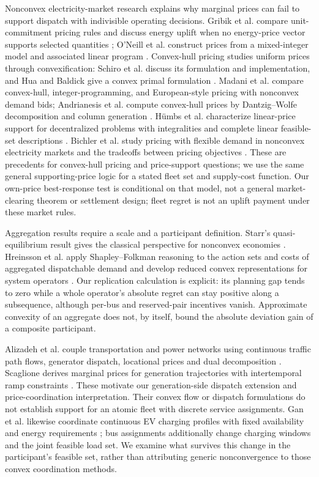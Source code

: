 Nonconvex electricity-market research explains why marginal prices can fail to support dispatch with indivisible operating decisions. Gribik et al. compare unit-commitment pricing rules and discuss energy uplift when no energy-price vector supports selected quantities \citep{gribikHoganPope2007}; O'Neill et al. construct prices from a mixed-integer model and associated linear program \citep{oneill2005}. Convex-hull pricing studies uniform prices through convexification: Schiro et al. discuss its formulation and implementation, and Hua and Baldick give a convex primal formulation \citep{schiro2016,huaBaldick2017}. Madani et al. compare convex-hull, integer-programming, and European-style pricing with nonconvex demand bids; Andrianesis et al. compute convex-hull prices by Dantzig--Wolfe decomposition and column generation \citep{madani2018pricing,andrianesis2022hull}. Hümbs et al. characterize linear-price support for decentralized problems with integralities and complete linear feasible-set descriptions \citep{huembs2022complete}. Bichler et al. study pricing with flexible demand in nonconvex electricity markets and the tradeoffs between pricing objectives \citep{bichler2023demand}. These are precedents for convex-hull pricing and price-support questions; we use the same general supporting-price logic for a stated fleet set and supply-cost function. Our own-price best-response test is conditional on that model, not a general market-clearing theorem or settlement design; fleet regret is not an uplift payment under these market rules.

Aggregation results require a scale and a participant definition. Starr's quasi-equilibrium result gives the classical perspective for nonconvex economies \citep{starr1969}. Hreinsson et al. apply Shapley--Folkman reasoning to the action sets and costs of aggregated dispatchable demand and develop reduced convex representations for system operators \citep{hreinsson2021}. Our replication calculation is explicit: its planning gap tends to zero while a whole operator's absolute regret can stay positive along a subsequence, although per-bus and reserved-pair incentives vanish. Approximate convexity of an aggregate does not, by itself, bound the absolute deviation gain of a composite participant.

Alizadeh et al. couple transportation and power networks using continuous traffic path flows, generator dispatch, locational prices and dual decomposition \citep{alizadeh2016coupled}. Scaglione derives marginal prices for generation trajectories with intertemporal ramp constraints \citep{scaglione2016marginal}. These motivate our generation-side dispatch extension and price-coordination interpretation. Their convex flow or dispatch formulations do not establish support for an atomic fleet with discrete service assignments. Gan et al. likewise coordinate continuous EV charging profiles with fixed availability and energy requirements \citep{ganTopcuLow2013}; bus assignments additionally change charging windows and the joint feasible load set. We examine what survives this change in the participant's feasible set, rather than attributing generic nonconvergence to those convex coordination methods.

